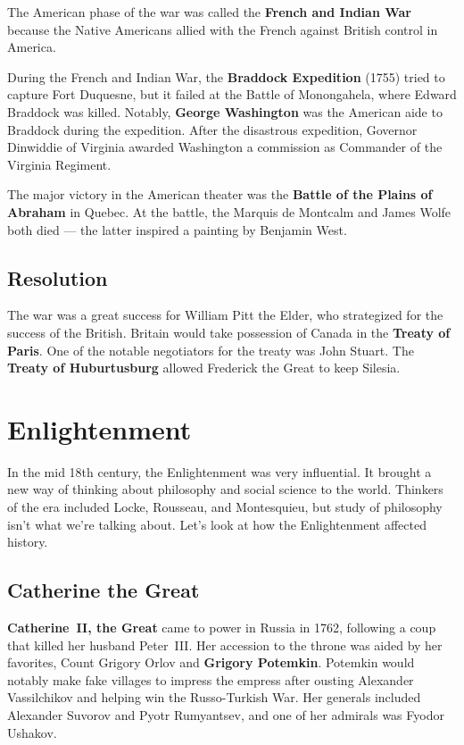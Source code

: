 The American phase of the war was called the \textbf{French and Indian War}
because the Native Americans allied with the French against British control in America.

During the French and Indian War, the \textbf{Braddock Expedition} (1755) tried to capture Fort Duquesne,
but it failed at the Battle of Monongahela, where Edward Braddock was killed.
Notably, \textbf{George Washington} was the American aide to Braddock during the expedition.
After the disastrous expedition,
Governor Dinwiddie of Virginia awarded Washington a commission as Commander of the Virginia Regiment.

The major victory in the American theater was the \textbf{Battle of the Plains of Abraham} in Quebec.
At the battle, the Marquis de Montcalm and James Wolfe both died --- the latter inspired a painting by Benjamin West.

\subsection*{Resolution}

The war was a great success for William Pitt the Elder, who strategized for the success of the British.
Britain would take possession of Canada in the \textbf{Treaty of Paris}.
One of the notable negotiators for the treaty was John Stuart.
The \textbf{Treaty of Huburtusburg} allowed Frederick the Great to keep Silesia.

\section{Enlightenment}

In the mid 18th century, the Enlightenment was very influential.
It brought a new way of thinking about philosophy and social science to the world.
Thinkers of the era included Locke, Rousseau, and Montesquieu,
but study of philosophy isn't what we're talking about.
Let's look at how the Enlightenment affected history.

\subsection*{Catherine the Great}

\textbf{Catherine~II, the Great} came to power in Russia in 1762,
following a coup that killed her husband Peter~III\@.
Her accession to the throne was aided by her favorites,
Count Grigory Orlov and \textbf{Grigory Potemkin}.
Potemkin would notably make fake villages to impress the empress
after ousting Alexander Vassilchikov and helping win the Russo-Turkish War.
Her generals included Alexander Suvorov and Pyotr Rumyantsev, and one of her admirals was Fyodor Ushakov.

